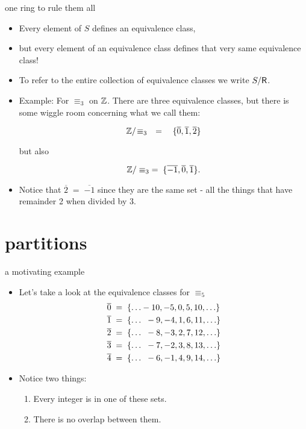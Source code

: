 \documentclass[handout,landscape]{beamer}
\begin{document}
\begin{frame}{one ring to rule them all}
\begin{itemize}
\item Every element of $S$ defines an equivalence class, \pause
\item but every element of an equivalence class defines that very same equivalence class!\pause
\item To refer to the entire collection of equivalence classes we write $S/\mbox{\textsf R}$. \pause
\item Example: For $\equiv_3$ on ${\mathbb Z}$.  There are three equivalence classes, but there is some wiggle room concerning what we call them:
\pause

\[ {\mathbb Z} /\!\equiv_3 \quad = \quad \{ \overline{0}, \overline{1}, \overline{2} \} \]

\pause

but also

\[ {\mathbb Z} / \equiv_3 \; = \; \{ \overline{-1}, \overline{0}, \overline{1} \}. \]

\pause

\item Notice that $\overline{2} \; = \;\overline{-1}$ since they are the same set - all the things that have remainder 2 when divided by 3. 
\end{itemize}
\end{frame}
  
\section{partitions}

\begin{frame}{a motivating example}
\begin{itemize}
\item Let's take a look at the equivalence classes for $\equiv_5$ \pause
\begin{align*}
 \overline{0} \; &= \; \{ \ldots -10, -5, 0, 5, 10, \ldots \} \\
 \overline{1} \; &= \; \{ \ldots \rule{4pt}{0pt} -9, -4, 1, 6, 11, \ldots \} \\
 \overline{2} \; &= \; \{ \ldots \rule{4pt}{0pt}-8, -3, 2, 7, 12, \ldots \} \\
 \overline{3} \; &= \; \{ \ldots \rule{4pt}{0pt}-7, -2, 3, 8, 13, \ldots \} \\
 \overline{4} \; &= \; \{ \ldots \rule{4pt}{0pt}-6, -1, 4, 9, 14, \ldots \} \\
 \end{align*}
 \pause
\item Notice two things: 
\begin{enumerate}
  \item Every integer is in one of these sets.
  \item There is no overlap between them.
\end{enumerate}
\end{itemize}
\end{frame}
\end{document}
